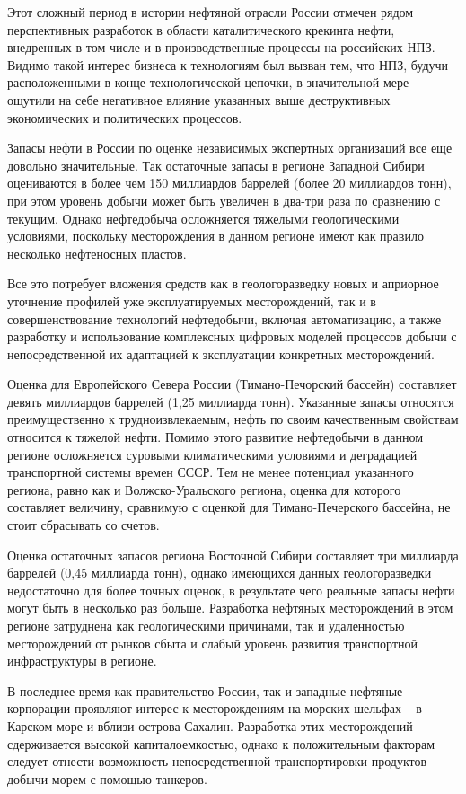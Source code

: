 Этот сложный период в истории нефтяной отрасли России отмечен рядом перспективных разработок в области каталитического крекинга нефти, внедренных в том числе и в производственные процессы на российских НПЗ.
Видимо такой интерес бизнеса к технологиям был вызван тем, что НПЗ, будучи расположенными в конце технологической цепочки, в значительной мере ощутили на себе негативное влияние указанных выше деструктивных экономических и политических процессов.

Запасы нефти в России по оценке независимых экспертных организаций все еще довольно значительные.
Так остаточные запасы в регионе Западной Сибири оцениваются в более чем 150 миллиардов баррелей (более 20 миллиардов тонн), при этом уровень добычи может быть увеличен в два-три раза по сравнению с текущим.
Однако нефтедобыча осложняется тяжелыми геологическими условиями, поскольку месторождения в данном регионе имеют как правило несколько нефтеносных пластов.

Все это потребует вложения средств как в геологоразведку новых и априорное уточнение профилей уже эксплуатируемых месторождений, так и в совершенствование технологий нефтедобычи, включая автоматизацию, а также разработку и использование комплексных цифровых моделей процессов добычи с непосредственной их адаптацией к эксплуатации конкретных месторождений.

Оценка для Европейского Севера России (Тимано-Печорский бассейн) составляет девять миллиардов баррелей (1,25 миллиарда тонн).
Указанные запасы относятся преимущественно к трудноизвлекаемым, нефть по своим качественным свойствам относится к тяжелой нефти.
Помимо этого развитие нефтедобычи в данном регионе осложняется суровыми климатическими условиями и деградацией транспортной системы времен СССР.
Тем не менее потенциал указанного региона, равно как и Волжско-Уральского региона, оценка для которого составляет величину, сравнимую с оценкой для Тимано-Печерского бассейна, не стоит сбрасывать со счетов.

Оценка остаточных запасов региона Восточной Сибири составляет три миллиарда баррелей (0,45 миллиарда тонн), однако имеющихся данных геологоразведки недостаточно для более точных оценок, в результате чего реальные запасы нефти могут быть в несколько раз больше.
Разработка нефтяных месторождений в этом регионе затруднена как геологическими причинами, так и удаленностью месторождений от рынков сбыта и слабый уровень развития транспортной инфраструктуры в регионе.

В последнее время как правительство России, так и западные нефтяные корпорации проявляют интерес к месторождениям на морских шельфах -- в Карском море и вблизи острова Сахалин.
Разработка этих месторождений сдерживается высокой капиталоемкостью, однако к положительным факторам следует отнести возможность непосредственной транспортировки продуктов добычи морем с помощью танкеров.

